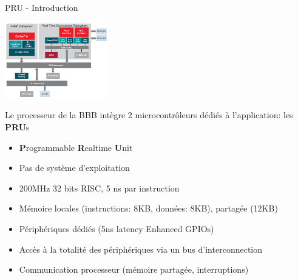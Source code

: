 \documentclass{beamer}
\begin{document}
\begin{frame}{PRU - Introduction}

  \begin{center}
    \includegraphics[width=45mm]{./pic/pru_interconnect.jpg}
  \end{center}

  \begin{tiny}
    Le processeur de la BBB int\`egre 2 microcontr\^oleurs d\'edi\'es \`a l'application: les \textbf{PRU}s
    \begin{itemize}
    \item \textbf{P}rogrammable \textbf{R}ealtime \textbf{U}nit
    \item Pas de syst\`eme d'exploitation
    \item 200MHz 32 bits RISC, 5 ns par instruction
    \item M\'emoire locales (instructions: 8KB, donn\'ees: 8KB), partag\'ee (12KB)
    \item P\'eriph\'eriques d\'edi\'es (5ns latency Enhanced GPIOs)
    \item Acc\`es \`a la totalit\'e des p\'eriph\'eriques via un bus d'interconnection
    \item Communication processeur (m\'emoire partag\'ee, interruptions)
    \end{itemize}
  \end{tiny}

\end{frame}
\end{document}

